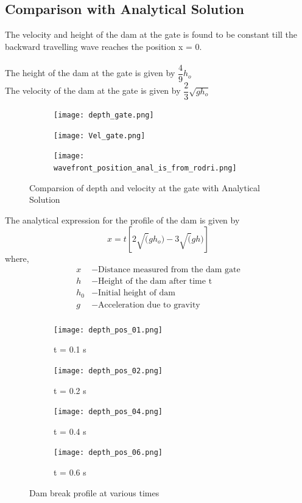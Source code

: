 \documentclass{article}
\begin{document}
\newpage
\subsection{Comparison with Analytical Solution}
The velocity and height of the dam at the gate is found to be constant till the 
backward travelling wave reaches the position x = 0.\\
\\
The height of the dam at the gate is given by $\dfrac{4}{9}h_o$\\
The velocity of the dam at the gate is given by $\dfrac{2}{3}\sqrt{gh_o}$

\begin{figure}[!htbp]
\centering
\begin{subfigure}{.5\textwidth}
  \centering
  \texttt{[image: depth\_gate.png]}
  \caption{}
  \label{fig:s11}
\end{subfigure}%
\begin{subfigure}{.5\textwidth}
  \centering
  \texttt{[image: Vel\_gate.png]}
  \caption{}
  \label{fig:s21}
\end{subfigure}
\begin{subfigure}{.5\textwidth}
  \centering
  \texttt{[image: wavefront\_position\_anal\_is\_from\_rodri.png]}
  \caption{}
  \label{fig:s31}
\end{subfigure}
\caption{Comparsion of depth and velocity at the gate with Analytical Solution}
\label{fig:rect1}
\end{figure}

\newpage
The analytical expression for the profile of the dam is given by 
\begin{equation}
    x = t[2\sqrt(gh_o) - 3\sqrt(gh)]
    \label{}
\end{equation}
where,
\begin{align*}
    x &- \text{Distance measured from the dam gate}\\
    h &- \text{Height of the dam after time t}\\
    h_0 &- \text{Initial height of dam}\\
    g &- \text{Acceleration due to gravity}\\
\end{align*}
\begin{figure}[!htbp]
\centering
\begin{subfigure}{.5\textwidth}
  \centering
  \texttt{[image: depth\_pos\_01.png]}
  \caption{t = 0.1 s}
  \label{fig:sun1}
\end{subfigure}%
\begin{subfigure}{.5\textwidth}
  \centering
  \texttt{[image: depth\_pos\_02.png]}
  \caption{t = 0.2 s}
  \label{fig:sun2}
\end{subfigure}
\begin{subfigure}{.5\textwidth}
  \centering
  \texttt{[image: depth\_pos\_04.png]}
  \caption{t = 0.4 s}
  \label{fig:sun3}
\end{subfigure}%
\begin{subfigure}{.5\textwidth}
  \centering
  \texttt{[image: depth\_pos\_06.png]}
  \caption{t = 0.6 s}
  \label{fig:sun4}
\end{subfigure}
\caption{Dam break profile at various times}
\label{fig:rect2}
\end{figure}
\end{document}
